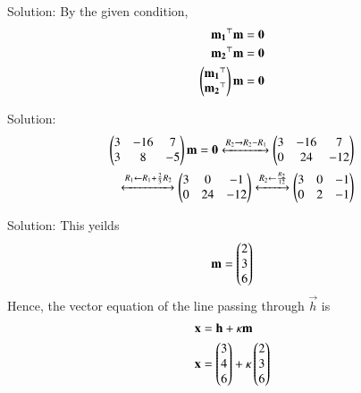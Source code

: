 \documentclass{beamer}
\begin{document}
\begin{frame}{Solution:}
By the given condition,
\begin{align}
    \mathbf{m_1}^\top\mathbf{m} &= \mathbf{0}\\
    \mathbf{m_2}^\top\mathbf{m} &= \mathbf{0}\\
    \begin{pmatrix}\mathbf{m_1}^\top \\ \mathbf{m_2}^\top\end{pmatrix} \mathbf{m} &= \mathbf{0}
\end{align}
\end{frame}

\begin{frame}{Solution:}
\begin{align}
    \begin{pmatrix}3 & -16 & 7 \\ 3 & 8 & -5\end{pmatrix}\mathbf{m} = \mathbf{0} \xleftrightarrow[]
    {R_2\rightarrow R_2 - R_1} \begin{pmatrix}3 & -16 & 7 \\ 0 & 24 & -12\end{pmatrix}\\ 
    \xleftrightarrow[]{R_1\leftarrow R_1 + \frac{2}{3}R_2} \begin{pmatrix}3 & 0 & -1 \\ 0 & 24 & -12\end{pmatrix} \xleftrightarrow[]{R_2\leftarrow \frac{R_2}{12}}\begin{pmatrix}3 & 0 & -1 \\ 0 & 2 & -1\end{pmatrix}
\end{align}
\end{frame}

\begin{frame}{Solution:}
  This yeilds
\begin{align}
    \mathbf{m} = \begin{pmatrix}2 \\ 3 \\ 6\end{pmatrix}
\end{align}
Hence, the vector equation of the line passing through $\vec{h}$ is 
\begin{align}
    \mathbf{x} &= \mathbf{h} + \kappa \mathbf{m}\\
    \mathbf{x} &= \begin{pmatrix}3 \\ 4 \\ 6\end{pmatrix} + \kappa \begin{pmatrix}2 \\ 3 \\ 6\end{pmatrix}
\end{align}
\end{frame}
\end{document}
